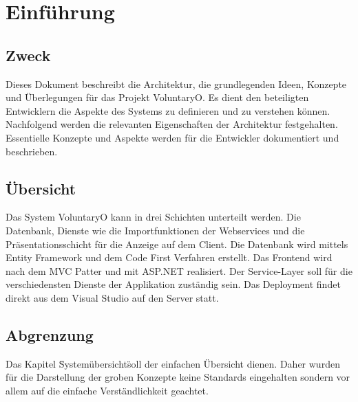 \chapter{Einführung}
	\section{Zweck}
	Dieses Dokument beschreibt die Architektur, die grundlegenden Ideen, Konzepte und Überlegungen für das Projekt VoluntaryO. Es dient den beteiligten Entwicklern die Aspekte des Systems zu definieren und zu verstehen können.
	Nachfolgend werden die relevanten Eigenschaften der Architektur festgehalten. Essentielle Konzepte und Aspekte werden für die Entwickler dokumentiert und beschrieben.
	
	\section{Übersicht}
	Das System VoluntaryO kann in drei Schichten unterteilt werden. Die Datenbank, Dienste wie die Importfunktionen der Webservices und die Präsentationsschicht für die Anzeige auf dem Client.
	Die Datenbank wird mittels Entity Framework und dem Code First Verfahren erstellt. Das Frontend wird nach dem MVC Patter und mit ASP.NET realisiert. Der Service-Layer soll für die verschiedensten Dienste der Applikation zuständig sein.
	Das Deployment findet direkt aus dem Visual Studio auf den Server statt.

	\section{Abgrenzung}
	Das Kapitel \"Systemübersicht\" soll der einfachen Übersicht dienen. Daher wurden für die Darstellung der groben Konzepte keine Standards eingehalten sondern vor allem auf die einfache Verständlichkeit geachtet.
